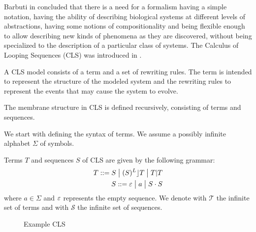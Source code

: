 Barbuti in \cite{Barbuti07CLS} concluded that there is a need for a formalism having a simple notation, having the ability of describing biological systems at different levels of abstractions, having some notions of compositionality and being flexible enough to allow describing new kinds of phenomena as they are discovered, without being specialized to the description of a particular class of systems. The  Calculus of Looping Sequences (CLS) was introduced in \cite{Barbuti07CLS}.

A CLS model consists of a term and a set of rewriting rules. The term is intended to represent the structure of the modeled system and the rewriting rules to represent the events that may cause the system to evolve.

The membrane structure in CLS is defined recursively, consisting of terms and sequences.

We start with defining the syntax of terms. We assume a possibly infinite alphabet $\Sigma$ of symbols.

\begin{definition}
  Terms $T$ and sequences $S$ of CLS are given by the following grammar:
  \begin{align*}
    T ::= S \;\big|\; (S)^L\rfloor T \;\big|\; T|T\\
    S ::= \varepsilon \;\big|\; a \;\big|\; S\cdot S
  \end{align*}
  where $a\in \Sigma$ and $\varepsilon$ represents the empty sequence. We denote with $\mathcal T$ the infinite set of terms and with $\mathcal S$ the infinite set of sequences.
\end{definition}

\begin{figure}
  \centering
  \caption{Example CLS}
  \label{fig:example cls}
\end{figure}

